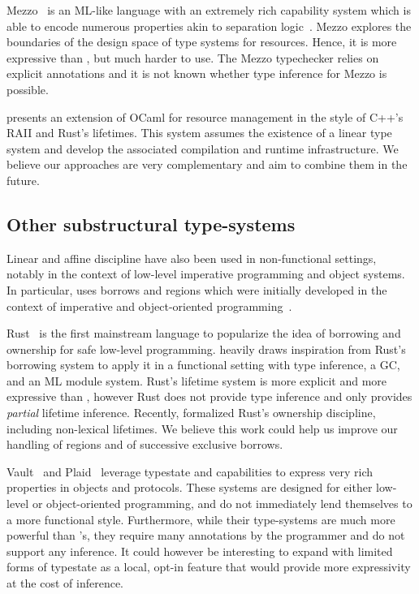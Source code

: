 Mezzo~\citep{DBLP:phd/hal/Protzenko14} is an ML-like language
with an extremely rich capability system which is able to encode numerous
properties akin to separation logic~\citep{DBLP:conf/lics/Reynolds02}.
Mezzo explores the  boundaries of the design space of type systems for
resources. Hence, it is more expressive than \lang, but
much harder to use. The Mezzo typechecker relies on explicit
annotations and it is not known whether type inference for Mezzo is possible.

\citet{DBLP:journals/corr/abs-1803-02796} presents
an extension of OCaml for resource management in the style of C++'s RAII
and Rust's lifetimes. This system assumes
the existence of a linear type system and develop the associated compilation
and runtime infrastructure. We believe our approaches are very
complementary and aim to combine them in the future.

\subsection{Other substructural type-systems}

Linear and affine discipline have also been used in non-functional
settings, notably in the context of low-level imperative programming
and object systems. In particular, \lang uses borrows and regions
which were initially developed in the context of imperative and
object-oriented
programming~\citep{DBLP:conf/popl/BoylandR05,DBLP:conf/pldi/GrossmanMJHWC02}.

Rust~\citep{rust} is the first
mainstream language to popularize the idea of borrowing and ownership
for safe low-level programming.
\lang heavily draws inspiration from Rust's borrowing system to apply
it in a functional setting with type inference, a GC, and
an ML module system.
Rust's lifetime system is more explicit and more expressive than \lang,
however Rust does not provide type inference
and only provides \emph{partial} lifetime inference.
Recently, \citet{DBLP:journals/corr/abs-1903-00982}
formalized Rust's ownership discipline, including non-lexical lifetimes.
We believe this work
could help us improve our handling of regions and of successive exclusive borrows.

Vault~\citep{DBLP:conf/pldi/DeLineF01}
and Plaid~\citep{DBLP:conf/oopsla/AldrichSSS09}
leverage typestate and capabilities
to express very rich properties in objects and protocols.
These systems are designed for either low-level or object-oriented
programming, and do not immediately lend themselves to a more functional
style. Furthermore, while their type-systems are much more
powerful than \affe's, they require many annotations by the programmer
and do not support any inference.
It could however be interesting to expand \affe with limited
forms of typestate as a local, opt-in feature that would provide
more expressivity at the cost of inference.

